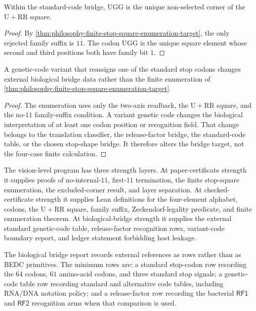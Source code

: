 \begin{corollary}
\label{cor:philosophy-distinguished-non-stop-corner}
Within the standard-code bridge, $\mathrm{UGG}$ is the unique
non-selected corner of the $\mathrm{U}+\mathrm{RR}$ square.
\end{corollary}
\begin{proof}
By \autoref{thm:philosophy-finite-stop-square-enumeration-target}, the
only rejected family suffix is $11$. The codon $\mathrm{UGG}$ is the
unique square element whose second and third positions both have family
bit $1$.
\end{proof}

\begin{theorem}
\label{thm:philosophy-variant-code-deformation-boundary}
A genetic-code variant that reassigns one of the standard stop codons
changes external biological bridge data rather than the finite
enumeration of \autoref{thm:philosophy-finite-stop-square-enumeration-target}.
\end{theorem}
\begin{proof}
The enumeration uses only the two-axis readback, the
$\mathrm{U}+\mathrm{RR}$ square, and the no-$11$ family-suffix
condition. A variant genetic code changes the biological interpretation
of at least one codon position or recognition field. That change belongs
to the translation classifier, the release-factor bridge, the
standard-code table, or the chosen stop-shape bridge. It therefore
alters the bridge target, not the four-case finite calculation.
\end{proof}

\begin{definition}
\label{def:philosophy-stop-program-certificate-ladder}
The vision-level program has three strength layers. At paper-certificate
strength it supplies proofs of no-internal-$11$, first-$11$ termination,
the finite stop-square enumeration, the excluded-corner result, and
layer separation. At checked-certificate strength it supplies Lean
definitions for the four-element alphabet, codons, the
$\mathrm{U}+\mathrm{RR}$ square, family suffix, Zeckendorf-legality
predicate, and finite enumeration theorem. At biological-bridge
strength it supplies the external standard genetic-code table,
release-factor recognition rows, variant-code boundary report, and
ledger statement forbidding host leakage.
\end{definition}

\begin{definition}
\label{def:philosophy-zterm-external-reference-rows}
The biological bridge report records external references as rows rather
than as BEDC primitives. The minimum rows are: a standard stop-codon row
recording the $64$ codons, $61$ amino-acid codons, and three standard
stop signals; a genetic-code table row recording standard and
alternative code tables, including RNA/DNA notation policy; and a
release-factor row recording the bacterial $\mathsf{RF1}$ and
$\mathsf{RF2}$ recognition arms when that comparison is used.
\end{definition}


